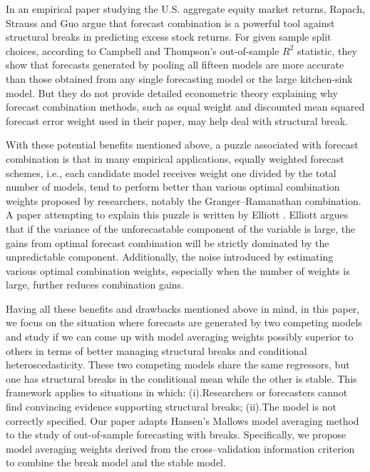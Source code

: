 In an empirical paper studying the U.S. aggregate equity market returns, Rapach, Strauss and Guo \cite{rsz2010} argue that forecast combination is a powerful tool against structural breaks in predicting excess stock returns. For given sample split choices, according to Campbell and Thompson's \cite{campbell_thompson_RFS2008} out-of-sample $R^{2}$ statistic, they show that forecasts generated by pooling all fifteen models are more accurate than those obtained from any single forecasting model or the large kitchen-sink model. But they do not provide detailed econometric theory explaining why forecast combination methods, such as equal weight and discounted mean squared forecast error weight used in their paper, may help deal with structural break. 

With these potential benefits mentioned above, a puzzle associated with forecast combination is that in many empirical applications, equally weighted forecast schemes, i.e., each candidate model receives weight one divided by the total number of models, tend to perform better than various optimal combination weights proposed by researchers, notably the Granger--Ramanathan combination. A paper attempting to explain this puzzle is written by Elliott \cite{elliott11}. Elliott argues that if the variance of the unforecastable component of the variable is large, the gains from optimal forecast combination will be strictly dominated by the unpredictable component. Additionally, the noise introduced by estimating various optimal combination weights, especially when the number of weights is large, further reduces combination gains. 

Having all these benefits and drawbacks mentioned above in mind, in this paper, we focus on the situation where forecasts are generated by two competing models and study if we can come up with model averaging weights possibly superior to others in terms of better managing structural breaks and conditional heteroscedasticity. These two competing models share the same regressors, but one has structural breaks in the conditional mean while the other is stable. This framework applies to situations in which: (i).Researchers or forecasters cannot find convincing evidence supporting structural breaks; (ii).The model is not correctly specified. Our paper adapts Hansen's Mallows model averaging method \cite{hansen2009averaging} to the study of out-of-sample forecasting with breaks. Specifically, we propose model averaging weights derived from the cross--validation information criterion to combine the break model and the stable model. 


